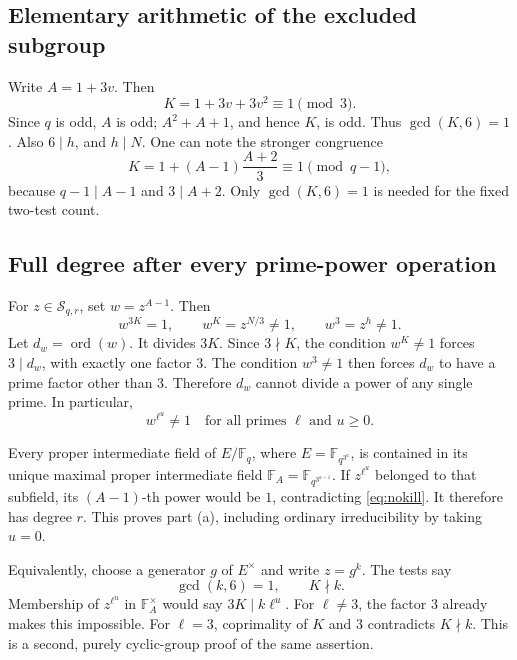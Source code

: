 \documentclass[11pt,a4paper]{article}
\theoremstyle{definition}
\theoremstyle{remark}
\newcommand{\F}{\mathbb F}
\newcommand{\ord}{\operatorname{ord}}
\newcommand{\good}{\mathcal S}
\begin{document}
\subsection{Elementary arithmetic of the excluded subgroup}

Write \(A=1+3v\). Then
\begin{equation}
       K=1+3v+3v^2\equiv1\pmod3 .
       \label{eq:kmod3}
\end{equation}
Since \(q\) is odd, \(A\) is odd; \(A^2+A+1\), and hence \(K\), is odd.
Thus \(\gcd(K,6)=1\). Also \(6\mid h\), and \(h\mid N\).
One can note the stronger congruence
\[
 K=1+(A-1)\frac{A+2}{3}\equiv1\pmod{q-1},
\]
because \(q-1\mid A-1\) and \(3\mid A+2\). Only \(\gcd(K,6)=1\)
is needed for the fixed two-test count.

\subsection{Full degree after every prime-power operation}

For \(z\in\good_{q,r}\), set \(w=z^{A-1}\).
Then
\begin{equation}
       w^{3K}=1,\qquad w^K=z^{N/3}\ne1,\qquad w^3=z^h\ne1.
       \label{eq:w}
\end{equation}
Let \(d_w=\ord(w)\). It divides \(3K\). Since \(3\nmid K\), the
condition \(w^K\ne1\) forces \(3\mid d_w\), with exactly one factor \(3\).
The condition \(w^3\ne1\) then forces \(d_w\) to have a prime factor other than
\(3\). Therefore \(d_w\) cannot divide a power of any single prime.
In particular,
\begin{equation}
                     w^{\ell^u}\ne1
                     \quad\text{for all primes \(\ell\) and \(u\ge0\)}.
                     \label{eq:nokill}
\end{equation}

Every proper intermediate field of \(E/\F_q\), where \(E=\F_{q^{3^a}}\), is
contained in its unique maximal proper intermediate field
\(\F_A=\F_{q^{3^{a-1}}}\). If \(z^{\ell^u}\) belonged to that
subfield, its \((A-1)\)-th power would be \(1\), contradicting \eqref{eq:nokill}.
It therefore has degree \(r\). This proves part (a), including ordinary
irreducibility by taking \(u=0\).

Equivalently, choose a generator \(g\) of \(E^\times\) and write \(z=g^k\).
The tests say
\begin{equation}
                     \gcd(k,6)=1,\qquad K\nmid k.
                     \label{eq:kselection}
\end{equation}
Membership of \(z^{\ell^u}\) in \(\F_A^\times\) would say
\(3K\mid k\ell^u\). For \(\ell\ne3\), the factor \(3\) already makes this
impossible. For \(\ell=3\), coprimality of \(K\) and \(3\) contradicts
\(K\nmid k\). This is a second, purely cyclic-group proof of the same assertion.
\end{document}
